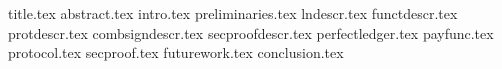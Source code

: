 \documentclass[conference,compsoc]{IEEEtran}
\begin{document}
\pagestyle{plain}
{title.tex}
{abstract.tex}
{intro.tex}
{preliminaries.tex}
{lndescr.tex}
{functdescr.tex}
{protdescr.tex}
{combsigndescr.tex}
{secproofdescr.tex}
{perfectledger.tex}
{payfunc.tex}
{protocol.tex}
{secproof.tex}
{futurework.tex}
{conclusion.tex}



\end{document}

